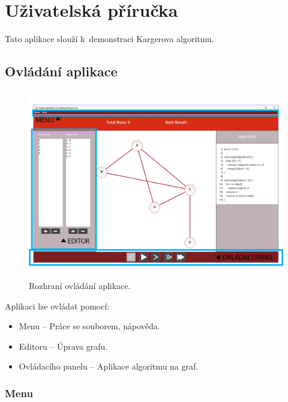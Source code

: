 \documentclass[../projekt.tex]{subfiles}
\begin{document}
\chapter{Uživatelská příručka}

Tato aplikace slouží k~demonstraci Kargerova algoritmu. 

\section{Ovládání aplikace}


	\begin{figure}[ht]
    	\begin{center}
  			\includegraphics[scale=0.36]{obrazky-figures/ovladani.png}
  			\caption{Rozhraní ovládání aplikace.}
  		\end{center}
	\end{figure}
	
Aplikaci lze ovládat pomocí:
	
\begin{itemize}
	\item Menu -- Práce se souborem, nápověda.
	\item Editoru -- Úprava grafu.
	\item Ovládacího panelu -- Aplikace algoritmu na graf.
\end{itemize}


\subsection{Menu}
\end{document}
